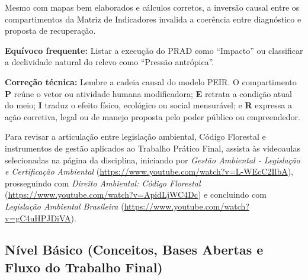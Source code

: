 Mesmo com mapas bem elaborados e cálculos corretos, a inversão causal entre os compartimentos da Matriz de Indicadores invalida a coerência entre diagnóstico e proposta de recuperação.

\begin{boxErro}
\textbf{Equívoco frequente:} Listar a execução do PRAD como ``Impacto'' ou classificar a declividade natural do relevo como ``Pressão antrópica''.\par
\textbf{Correção técnica:} Lembre a cadeia causal do modelo PEIR. O compartimento \textbf{P} reúne o vetor ou atividade humana modificadora; \textbf{E} retrata a condição atual do meio; \textbf{I} traduz o efeito físico, ecológico ou social mensurável; e \textbf{R} expressa a ação corretiva, legal ou de manejo proposta pelo poder público ou empreendedor.
\end{boxErro}

\begin{sloppypar}
Para revisar a articulação entre legislação ambiental, Código Florestal e instrumentos de gestão aplicados ao Trabalho Prático Final, assista às videoaulas selecionadas na página da disciplina, iniciando por \textit{Gestão Ambiental - Legislação e Certificação Ambiental} (\url{https://www.youtube.com/watch?v=L-WEcC2IlbA}), prosseguindo com \textit{Direito Ambiental: Código Florestal} (\url{https://www.youtube.com/watch?v=ApidLjWC4Dc}) e concluindo com \textit{Legislação Ambiental Brasileira} (\url{https://www.youtube.com/watch?v=gC4uHPJDiVA}).
\end{sloppypar}


\subsection*{Nível Básico (Conceitos, Bases Abertas e Fluxo do Trabalho Final)}

